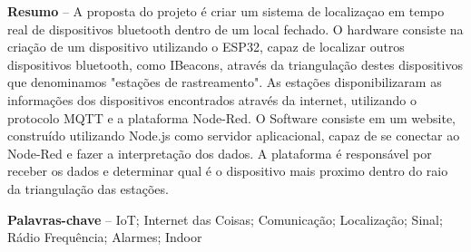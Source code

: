 \documentclass[
	article,			%
	12pt,				%
	oneside,			%
	a4paper,			%
	english,			%
	brazil,				%
	sumario=tradicional
	]{abntex2}
\begin{document}
\textual

\pagestyle{meuestilo}

\frenchspacing 

\maketitle

\thispagestyle{meuestilo}

\begin{changemargin}{1cm}{1cm} 
 \textbf{Resumo} – A proposta do projeto é criar um sistema de localizaçao em tempo real de dispositivos bluetooth dentro de um local fechado.
 O hardware consiste na criação de um dispositivo utilizando o ESP32, capaz de localizar outros dispositivos bluetooth, como IBeacons, através da triangulação destes dispositivos que denominamos "estações de rastreamento". 
 As estações disponibilizaram as informações dos dispositivos encontrados através da internet, utilizando o protocolo MQTT e a plataforma Node-Red.
 O Software consiste em um website, construído utilizando Node.js como servidor aplicacional, capaz de se conectar ao Node-Red e fazer a interpretação dos dados.
 A plataforma é responsável por receber os dados e determinar qual é o dispositivo mais proximo dentro do raio da triangulação das estações.
 \vspace{\onelineskip}
 
 \noindent
 \textbf{Palavras-chave} – IoT; Internet das Coisas; Comunicação; Localização; Sinal; Rádio Frequência; Alarmes; Indoor 
\end{changemargin}

\end{document}
